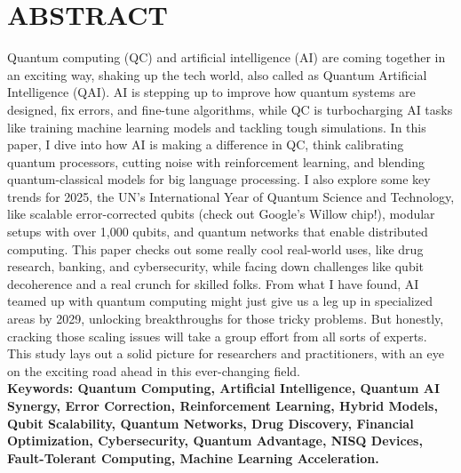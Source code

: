 \chapter*{ABSTRACT}
\hspace*{0.3in}
Quantum computing (QC) and artificial intelligence (AI) are coming together in an exciting way, shaking up the tech world, also called as  Quantum Artificial Intelligence (QAI). AI is stepping up to improve how quantum systems are designed, fix errors, and fine-tune algorithms, while QC is turbocharging AI tasks like training machine learning models and tackling tough simulations. In this paper, I dive into how AI is making a difference in QC, think calibrating quantum processors, cutting noise with reinforcement learning, and blending quantum-classical models for big language processing. I also explore some key trends for 2025, the UN’s International Year of Quantum Science and Technology, like scalable error-corrected qubits (check out Google’s Willow chip!), modular setups with over 1,000 qubits, and quantum networks that enable distributed computing.
This paper checks out some really cool real-world uses, like drug research, banking, and cybersecurity, while facing down challenges like qubit decoherence and a real crunch for skilled folks. From what I have found, AI teamed up with quantum computing might just give us a leg up in specialized areas by 2029, unlocking breakthroughs for those tricky problems. But honestly, cracking those scaling issues will take a group effort from all sorts of experts. This study lays out a solid picture for researchers and practitioners, with an eye on the exciting road ahead in this ever-changing field.
\\
\textbf{Keywords: Quantum Computing, Artificial Intelligence, Quantum AI Synergy, Error Correction,
	Reinforcement Learning, Hybrid Models, Qubit Scalability, Quantum Networks, Drug
	Discovery, Financial Optimization, Cybersecurity, Quantum Advantage, NISQ Devices,
	Fault-Tolerant Computing, Machine Learning Acceleration.
}\\